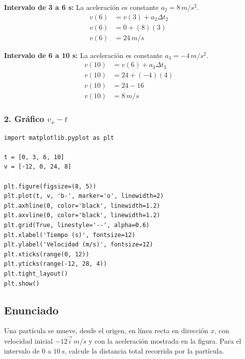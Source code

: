 \documentclass[12pt, a4paper]{article}
\begin{document}
\textbf{Intervalo de 3 a 6 s:}
La aceleración es constante $a_2 = 8 \, \si{m/s^2}$.
\begin{align*}
v(6) &= v(3) + a_2 \Delta t_2 \\
v(6) &= 0 + (8)(3) \\
v(6) &= 24 \, \si{m/s}
\end{align*}

\textbf{Intervalo de 6 a 10 s:}
La aceleración es constante $a_3 = -4 \, \si{m/s^2}$.
\begin{align*}
v(10) &= v(6) + a_3 \Delta t_3 \\
v(10) &= 24 + (-4)(4) \\
v(10) &= 24 - 16 \\
v(10) &= 8 \, \si{m/s}
\end{align*}

\subsubsection*{2. Gráfico $v_x - t$}

\begin{lstlisting}
import matplotlib.pyplot as plt

t = [0, 3, 6, 10]
v = [-12, 0, 24, 8]

plt.figure(figsize=(8, 5))
plt.plot(t, v, 'b-', marker='o', linewidth=2)
plt.axhline(0, color='black', linewidth=1.2)
plt.axvline(0, color='black', linewidth=1.2)
plt.grid(True, linestyle='--', alpha=0.6)
plt.xlabel('Tiempo (s)', fontsize=12)
plt.ylabel('Velocidad (m/s)', fontsize=12)
plt.xticks(range(0, 12))
plt.yticks(range(-12, 28, 4))
plt.tight_layout()
plt.show()
\end{lstlisting}

\newpage

\subsection*{Enunciado}
Una partícula se mueve, desde el origen, en línea recta en dirección $x$, con velocidad inicial $-12\vec{i} \, \si{m/s}$ y con la aceleración mostrada en la figura. Para el intervalo de $0$ a $10 \, \si{s}$, calcule la distancia total recorrida por la partícula.

\begin{center}
\end{center}
\end{document}
